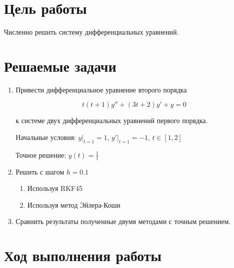 




\section{Цель работы}
Численно решить систему дифференциальных уравнений.

\section{Решаемые задачи}
\begin{enumerate}

\item Привести дифференциальное уравнение второго порядка

\begin{displaymath}
	t(t+1)y'' + (3t+2)y'  + y = 0
\end{displaymath}

к системе двух дифференциальных уравнений первого порядка.


	Начальные условия: $\left.y \right|_{t=1} = 1$, $\left.y' \right|_{t=1} = -1$, $t \in[1, 2]$  

    Точное решение: $y(t)=\frac{1}{t}$	
		


\item Решить с шагом $h = 0.1$

\begin{enumerate}[label=\arabic*)]
\item Используя RKF45
\item Используя метод Эйлера-Коши
\end{enumerate}

\item Сравнить результаты полученные двумя методами с точным решением.

\end{enumerate}


\section{Ход выполнения работы}

